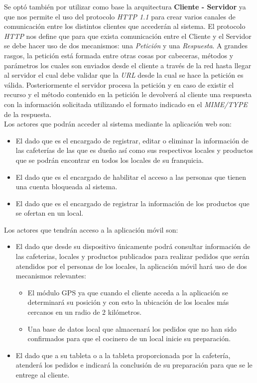 Se optó también por utilizar como base la arquitectura \textbf{Cliente - Servidor} ya que nos permite el uso del protocolo \textit{HTTP 1.1} para crear varios canales de comunicación entre los distintos clientes que accederán al sistema. El protocolo \textit{HTTP} nos define que para que exista comunicación entre el Cliente y el Servidor se debe hacer uso de dos mecanismos: una \textit{Petición} y una \textit{Respuesta}. A grandes rasgos, la petición está formada entre otras cosas por cabeceras, métodos y parámetros los cuales son enviados desde el cliente a través de la red hasta llegar al servidor el cual debe validar que la \textit{URL} desde la cual se hace la petición es válida. Posteriormente el servidor procesa la petición y en caso de existir el recurso y el método contenido en la petición le devolverá al cliente una respuesta con la información solicitada utilizando el formato indicado en el \textit{MIME/TYPE} de la respuesta.\\

Los actores que podrán acceder al sistema mediante la aplicación web son:
	\begin{itemize}
		\item El  dado que es el encargado de registrar, editar o eliminar la información de las cafeterías de las que es dueño así como sus respectivos locales y productos que se podrán encontrar en todos los locales de su franquicia.
		\item El  dado que es el encargado de habilitar el acceso a las personas que tienen una cuenta bloqueada al sistema.
		\item El  dado que es el encargado de registrar la información de los productos que se ofertan en un local.
	\end{itemize}

Los actores que tendrán acceso a la aplicación móvil son:
	\begin{itemize}
		\item El  dado que desde su dispositivo únicamente podrá consultar información de las cafeterias, locales y productos publicados para realizar pedidos que serán atendidos por el personas de los locales, la aplicación móvil hará uso de dos mecanismos relevantes:
		\begin{itemize}
			\item El módulo GPS ya que cuando el cliente acceda a la aplicación se determinará su posición y con esto la ubicación de los locales más cercanos en un radio de 2 kilómetros.
			\item Una base de datos local que almacenará los pedidos que no han sido confirmados para que el cocinero de un local inicie su preparación.
		\end{itemize}
		\item El  dado que a su tableta o a la tableta proporcionada por la cafetería, atenderá los pedidos e indicará la conclusión de su preparación para que se le entrege al cliente.
\end{itemize}


